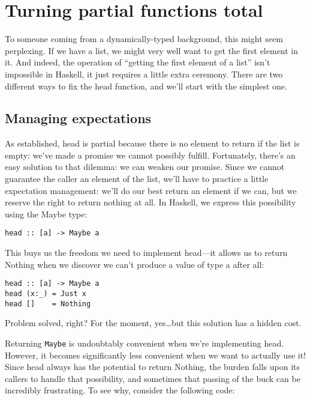 \section{Turning partial functions total}

To someone coming from a dynamically-typed background, this might seem perplexing. If we have a list, we might very well want to get the first element in it. And indeed, the operation of ``getting the first element of a list'' isn't impossible in Haskell, it just requires a little extra ceremony. There are two different ways to fix the head function, and we'll start with the simplest one.

\subsection{Managing expectations}

As established, head is partial because there is no element to return if the list is empty: we've made a promise we cannot possibly fulfill. Fortunately, there's an easy solution to that dilemma: we can weaken our promise. Since we cannot guarantee the caller an element of the list, we'll have to practice a little expectation management: we'll do our best return an element if we can, but we reserve the right to return nothing at all. In Haskell, we express this possibility using the Maybe type:

\begin{verbatim}
head :: [a] -> Maybe a
\end{verbatim}
This buys us the freedom we need to implement head—it allows us to return Nothing when we discover we can't produce a value of type a after all:

\begin{verbatim}
head :: [a] -> Maybe a
head (x:_) = Just x
head []    = Nothing
\end{verbatim}
Problem solved, right? For the moment, yes\ldots but this solution has a hidden cost.

Returning \texttt{Maybe} is undoubtably convenient when we're implementing head. However, it becomes significantly less convenient when we want to actually use it! Since head always has the potential to return Nothing, the burden falls upon its callers to handle that possibility, and sometimes that passing of the buck can be incredibly frustrating. To see why, consider the following code:

